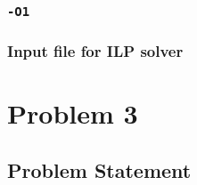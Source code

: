\documentclass[12pt,a4paper,titlepage,oneside]{article}
\begin{document}
\subsubsection{\texttt{-O1}}


\subsubsection{Input file for ILP solver}

\newpage
\section{Problem 3}

\subsection{Problem Statement}

\end{document}
